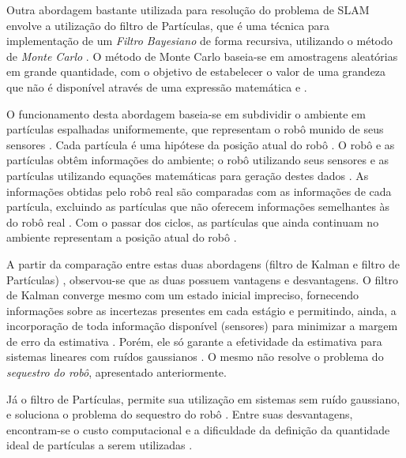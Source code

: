 Outra abordagem bastante utilizada para resolução do problema de SLAM envolve a utilização do filtro de Partículas, que é uma técnica para implementação de um \textit{Filtro Bayesiano} de forma recursiva, utilizando o método de \textit{Monte Carlo} \cite{integrationVisionSLAMnonlinear}. O método de Monte Carlo baseia-se em amostragens aleatórias em grande quantidade, com o objetivo de estabelecer o valor de uma grandeza que não é disponível através de uma expressão matemática \cite{mooney1997monte} e \cite{comparacaoKalmanParticulas}.

O funcionamento desta abordagem baseia-se em subdividir o ambiente em partículas espalhadas uniformemente, que representam o robô munido de seus sensores \cite{comparacaoKalmanParticulas}. Cada partícula é uma hipótese da posição atual do robô \cite{dp-slam}. O robô e as partículas obtêm informações do ambiente; o robô utilizando seus sensores e as partículas utilizando equações matemáticas para geração destes dados \cite{comparacaoKalmanParticulas}. As informações obtidas pelo robô real são comparadas com as informações de cada partícula, excluindo as partículas que não oferecem informações semelhantes às do robô real \cite{comparacaoKalmanParticulas}. Com o passar dos ciclos, as partículas que ainda continuam no ambiente representam a posição atual do robô \cite{comparacaoKalmanParticulas}.

A partir da comparação entre estas duas abordagens (filtro de Kalman e filtro de Partículas) \cite{comparacaoKalmanParticulas}, observou-se que as duas possuem vantagens e desvantagens. O filtro de Kalman converge mesmo com um estado inicial impreciso, fornecendo informações sobre as incertezas presentes em cada estágio e permitindo, ainda, a incorporação de toda informação disponível (sensores) para minimizar a margem de erro da estimativa \cite{comparacaoKalmanParticulas}. Porém, ele só garante a efetividade da estimativa para sistemas lineares com ruídos gaussianos \cite{comparacaoKalmanParticulas}. O mesmo não resolve o problema do \textit{sequestro do robô}, apresentado anteriormente.

Já o filtro de Partículas, permite sua utilização em sistemas sem ruído gaussiano, e soluciona o problema do sequestro do robô \cite{filtroParticulasComLEGO}. Entre suas desvantagens, encontram-se o custo computacional e a dificuldade da definição da quantidade ideal de partículas a serem utilizadas \cite{comparacaoKalmanParticulas}.


